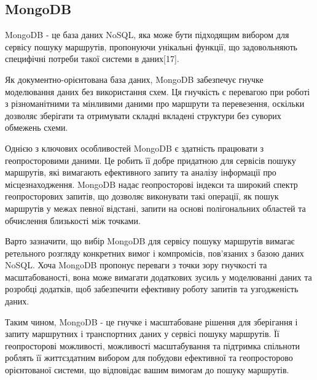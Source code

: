 \vspace{-\baselineskip}

\subsection{MongoDB}
\label{subsec:mongoDB-subsection}

MongoDB - це база даних NoSQL, яка може бути підходящим вибором для сервісу пошуку маршрутів, пропонуючи унікальні функції, що задовольняють специфічні потреби такої системи в даних[17].

Як документно-орієнтована база даних, MongoDB забезпечує гнучке моделювання даних без використання схем. Ця гнучкість є перевагою при роботі з різноманітними та мінливими даними про маршрути та перевезення, оскільки дозволяє зберігати та отримувати складні вкладені структури без суворих обмежень схеми.

Однією з ключових особливостей MongoDB є здатність працювати з геопросторовими даними. Це робить її добре придатною для сервісів пошуку маршрутів, які вимагають ефективного запиту та аналізу інформації про місцезнаходження. MongoDB надає геопросторові індекси та широкий спектр геопросторових запитів, що дозволяє виконувати такі операції, як пошук маршрутів у межах певної відстані, запити на основі полігональних областей та обчислення близькості між точками.

Варто зазначити, що вибір MongoDB для сервісу пошуку маршрутів вимагає ретельного розгляду конкретних вимог і компромісів, пов'язаних з базою даних NoSQL. Хоча MongoDB пропонує переваги з точки зору гнучкості та масштабованості, вона може вимагати додаткових зусиль у моделюванні даних та розробці додатків, щоб забезпечити ефективну роботу запитів та узгодженість даних.

Таким чином, MongoDB - це гнучке і масштабоване рішення для зберігання і запиту маршрутних і транспортних даних у сервісі пошуку маршрутів. Її геопросторові можливості, можливості масштабування та підтримка спільноти роблять її життєздатним вибором для побудови ефективної та геопросторово орієнтованої системи, що відповідає вашим вимогам до пошуку маршрутів.